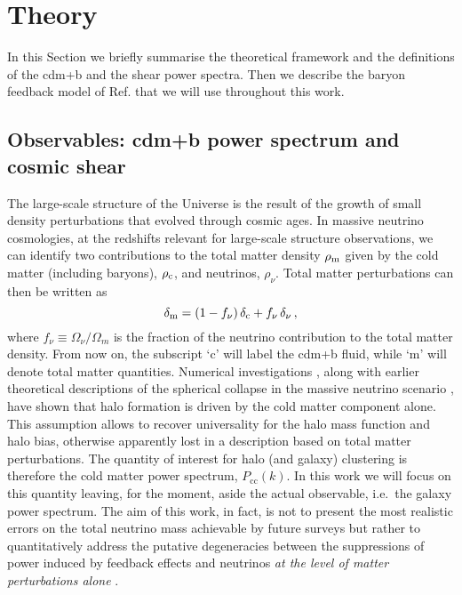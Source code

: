 \documentclass[a4paper,11pt]{article}
\newcommand{\be}{\begin{equation}}
\newcommand{\ee}{\end{equation}}
\begin{document}
{\section{Theory}
\label{sec:theory}

In this Section we briefly summarise the theoretical framework and the definitions of the cdm+b and the shear power spectra.
Then we describe the baryon feedback model of Ref. \cite{Schneider+15} that we will use throughout this work.



\subsection{Observables: cdm+b power spectrum and cosmic shear}
\label{sec:observables}

The large-scale structure of the Universe is the result of the growth
of small density perturbations that evolved through cosmic ages.  In
massive neutrino cosmologies, at the redshifts relevant for
large-scale structure observations, we can identify two contributions
to the total matter density $\rho_\textrm m$ given by the cold matter
(including baryons), $\rho_\textrm c$, and neutrinos,
$\rho_\nu$. Total matter perturbations can then be written as 
\be
\delta_\textrm m=(1-f_\nu)\,\delta_\textrm c+f_\nu\,\delta_\nu\,, 
\ee
where $f_\nu\equiv\Omega_\nu/\Omega_m$ is the fraction of the neutrino
contribution to the total matter density.  From now on, the subscript
`c' will label the cdm+b fluid, while `m' will denote total matter
quantities. Numerical investigations \cite{nuLCDM1+13, nuLCDM2+13,
  nuLCDM3+13, DEMNUni+16, Paco-Neutrinos+17, Ruggeri+18}, along with
earlier theoretical descriptions of the spherical collapse in the
massive neutrino scenario \cite{Ichiki+11}, have shown that halo
formation is driven by the cold matter component alone. This
assumption allows to recover universality for the halo mass function
and halo bias, otherwise apparently lost in a description based on
total matter perturbations. The quantity of interest for halo (and
galaxy) clustering is therefore the cold matter power spectrum,
$P_\textrm{cc}(k)$. In this work we will focus on this quantity
leaving, for the moment, aside the actual observable, i.e.~the galaxy
power spectrum. The aim of this work, in fact, is not to present the
most realistic errors on the total neutrino mass achievable by future
surveys but rather to quantitatively address the putative degeneracies
between the suppressions of power induced by feedback effects and
neutrinos \textit{at the level of matter perturbations alone} .

}
\end{document}
